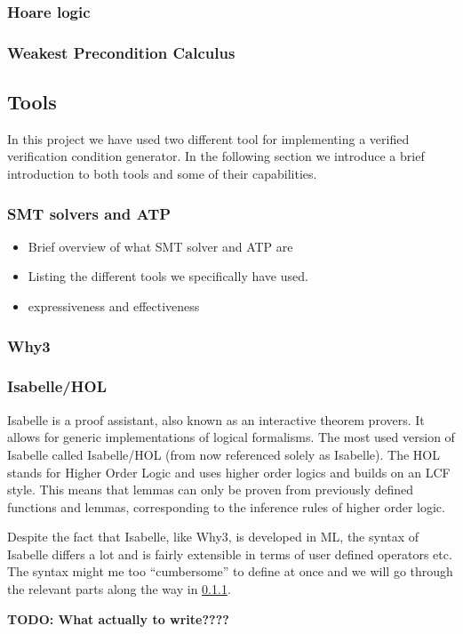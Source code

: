 \subsubsection{Hoare logic}\label{sec:hoare}


\subsubsection{Weakest Precondition Calculus}\label{sec:wp}


\subsection{Tools}
In this project we have used two different tool for implementing a verified verification condition generator.
In the following section we introduce a brief introduction to both tools and some of their capabilities.

\subsubsection{SMT solvers and ATP}

\begin{itemize}
  \item Brief overview of what SMT solver and ATP are
  \item Listing the different tools we specifically have used.
  \item expressiveness and effectiveness
\end{itemize}

\subsubsection{Why3}\label{sec:why3}


\subsubsection{Isabelle/HOL}\label{sec:isabelle}
Isabelle is a proof assistant, also known as an interactive theorem provers.
It allows for generic implementations of logical formalisms.
The most used version of Isabelle called Isabelle/HOL (from now referenced solely as Isabelle).
The HOL stands for Higher Order Logic and uses higher order logics and builds on an LCF style.
This means that lemmas can only be proven from previously defined functions and lemmas, corresponding to the inference rules of higher order logic.

Despite the fact that Isabelle, like Why3, is developed in ML, the syntax of Isabelle differs a lot and is fairly extensible in terms of user defined operators etc.
The syntax might me too ``cumbersome'' to define at once and we will go through the relevant parts along the way in \ref{}.

\textbf{TODO: What actually to write????}
